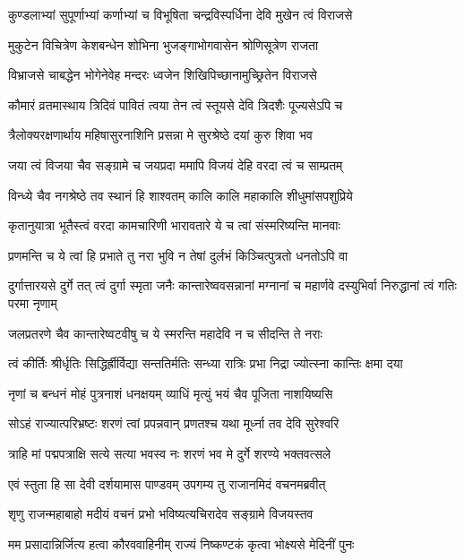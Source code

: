 \twolineshloka
{कुण्डलाभ्यां सुपूर्णाभ्यां कर्णाभ्यां च विभूषिता}
{चन्द्रविस्पर्धिना देवि मुखेन त्वं विराजसे}


\twolineshloka
{मुकुटेन विचित्रेण केशबन्धेन शोभिना}
{भुजङ्गाभोगवासेन श्रोणिसूत्रेण राजता}


\twolineshloka
{विभ्राजसे चाबद्धेन भोगेनेवेह मन्दरः}
{ध्वजेन शिखिपिच्छानामुच्छ्रितेन विराजसे}


\twolineshloka
{कौमारं व्रतमास्थाय त्रिदिवं पावितं त्वया}
{तेन त्वं स्तूयसे देवि त्रिदशैः पूज्यसेऽपि च}


\twolineshloka
{त्रैलोक्यरक्षणार्थाय महिषासुरनाशिनि}
{प्रसन्ना मे सुरश्रेष्ठे दयां कुरु शिवा भव}


\twolineshloka
{जया त्वं विजया चैव सङ्ग्रामे च जयप्रदा}
{ममापि विजयं देहि वरदा त्वं च साम्प्रतम्}


\twolineshloka
{विन्ध्ये चैव नगश्रेष्ठे तव स्थानं हि शाश्वतम्}
{कालि कालि महाकालि शीधुमांसपशुप्रिये}


\twolineshloka
{कृतानुयात्रा भूतैस्त्वं वरदा कामचारिणी}
{भारावतारे ये च त्वां संस्मरिष्यन्ति मानवाः}


\twolineshloka
{प्रणमन्ति च ये त्वां हि प्रभाते तु नरा भुवि}
{न तेषां दुर्लभं किञ्चित्पुत्रतो धनतोऽपि वा}


\threelineshloka
{दुर्गात्तारयसे दुर्गे तत् त्वं दुर्गा स्मृता जनैः}
{कान्तारेष्ववसन्नानां मग्नानां च महार्णवे}
{दस्युभिर्वा निरुद्धानां त्वं गतिः परमा नृणाम्}


\twolineshloka
{जलप्रतरणे चैव कान्तारेष्वटवीषु च}
{ये स्मरन्ति महादेवि न च सीदन्ति ते नराः}


\twolineshloka
{त्वं कीर्तिः श्रीर्धृतिः सिद्धिर्ह्रीर्विद्या सन्ततिर्मतिः}
{सन्ध्या रात्रिः प्रभा निद्रा ज्योत्स्ना कान्तिः क्षमा दया}


\twolineshloka
{नृणां च बन्धनं मोहं पुत्रनाशं धनक्षयम्}
{व्याधिं मृत्युं भयं चैव पूजिता नाशयिष्यसि}


\twolineshloka
{सोऽहं राज्यात्परिभ्रष्टः शरणं त्वां प्रपन्नवान्}
{प्रणतश्च यथा मूर्ध्ना तव देवि सुरेश्वरि}


\twolineshloka
{त्राहि मां पद्मपत्राक्षि सत्ये सत्या भवस्व नः}
{शरणं भव मे दुर्गे शरण्ये भक्तवत्सले}


\twolineshloka
{एवं स्तुता हि सा देवी दर्शयामास पाण्डवम्}
{उपगम्य तु राजानमिदं वचनमब्रवीत्}



\twolineshloka
{शृणु राजन्महाबाहो मदीयं वचनं प्रभो}
{भविष्यत्यचिरादेव सङ्ग्रामे विजयस्तव}


\twolineshloka
{मम प्रसादान्निर्जित्य हत्वा कौरववाहिनीम्}
{राज्यं निष्कण्टकं कृत्वा भोक्ष्यसे मेदिनीं पुनः}


